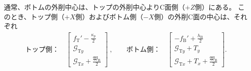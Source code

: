 通常、ボトムの外削中心は、トップの外削中心よりC面側（$+Z$側）にある。
このとき、トップ側（$+X$側）およびボトム側（$-X$側）の外削C面の中心は、それぞれ
\begin{align*}
  \text{トップ側：}\quad
  \left[
    \begin{array}{c}
      \displaystyle f_\mathrm T'-\frac{\kappa_p}2\\[5pt]
      \mathcal G_{\mathrm Ty}\\[3pt]
      \displaystyle \mathcal G_{\mathrm Tx}+\frac{\mathfrak W_\mathrm B}2
    \end{array}
    \right]~, \qquad
  \text{ボトム側：}\quad
  \left[
    \begin{array}{c}
      \displaystyle -f_\mathrm B'+\frac{h_\mathrm B}2\\[5pt]
      \mathcal G_{\mathrm Ty}+T_y\\[3pt]
      \displaystyle \mathcal G_{\mathrm Tx}+T_x+\frac{\mathfrak W_\mathrm B}2
    \end{array}
  \right].
\end{align*}




